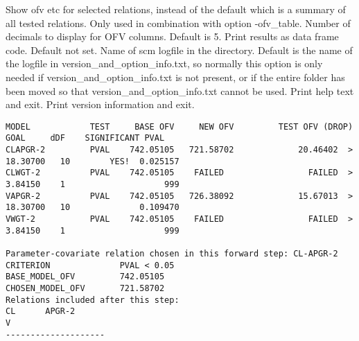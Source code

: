 \begin{optionlist}
Show ofv etc for selected relations, instead of the default which is
a summary of all tested relations.
\nextopt
{}
Only used in combination with option -ofv\_table.
Number of decimals to display for OFV columns. Default is 5.
\nextopt
{}
Print results as data frame code. Default not set.
\nextopt
{}
Name of scm logfile in the directory. 
Default is the name of the logfile in
version\_and\_option\_info.txt, 
so normally this option is only needed if version\_and\_option\_info.txt is not present,
or if the entire folder has been moved so that version\_and\_option\_info.txt cannot be used.
\nextopt
{}
Print help text and exit.
\nextopt
{}
Print version information and exit.
\nextopt
\end{optionlist}







{\tiny
\begin{verbatim}
MODEL            TEST     BASE OFV     NEW OFV         TEST OFV (DROP)    GOAL     dDF    SIGNIFICANT PVAL
CLAPGR-2         PVAL    742.05105   721.58702             20.46402  >  18.30700   10        YES!  0.025157 
CLWGT-2          PVAL    742.05105    FAILED                 FAILED  >   3.84150    1                    999
VAPGR-2          PVAL    742.05105   726.38092             15.67013  >  18.30700   10              0.109470 
VWGT-2           PVAL    742.05105    FAILED                 FAILED  >   3.84150    1                    999

Parameter-covariate relation chosen in this forward step: CL-APGR-2
CRITERION              PVAL < 0.05
BASE_MODEL_OFV         742.05105
CHOSEN_MODEL_OFV       721.58702
Relations included after this step:
CL      APGR-2  
V       
--------------------
\end{verbatim}
}
